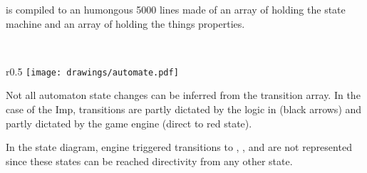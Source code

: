  is compiled to an humongous 5000 lines  made of an array of  holding the state machine and an array of  holding the things properties.\\
\par
{}\\
\par
\begin{wrapfigure}[9]{r}{0.5\textwidth}
\centering
\texttt{[image: drawings/automate.pdf]}
\end{wrapfigure}
Not all automaton state changes can be inferred from the transition array. In the case of the Imp, transitions are partly dictated by the logic in  (black arrows) and partly dictated by the game engine (direct to red state).\\
\par
 In the state diagram, engine triggered transitions to , , and  are not represented since these states can be reached directivity from any other state.
\par

\pagebreak

